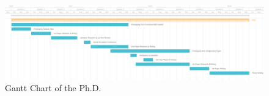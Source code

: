 \clearpage

\begin{landscape}
	\centering
	
	\begin{figure}
	\centering
	\includegraphics[width=1.5\textwidth, height=0.8\textwidth, angle=0]{./fig/phd_gantt.png}
	\caption{Gantt Chart of the Ph.D.}
	\label{fig:gantt}
\end{figure}
\end{landscape}
